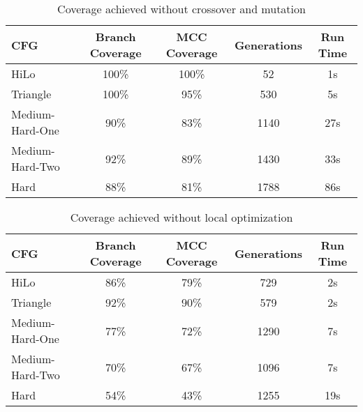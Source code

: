 \documentclass[runningheads]{llncs}
\begin{document}
\begin{table}[h!]
	\begin{center}
		\begin{tabular}{| l | c | c | c | c |}
			\hline
			CFG             & Branch Coverage & MCC Coverage & Generations & Run Time \\ \hline
			HiLo            & 100\%           & 100\%        & 52          & 1s       \\ \hline
			Triangle        & 100\%           & 95\%         & 530         & 5s       \\ \hline
			Medium-Hard-One & 90\%            & 83\%         & 1140        & 27s      \\ \hline
			Medium-Hard-Two & 92\%            & 89\%         & 1430        & 33s      \\ \hline
			Hard            & 88\%            & 81\%         & 1788        & 86s      \\ \hline
		\end{tabular}
	\end{center}
	\caption{Coverage achieved without crossover and mutation}
	\label{tab:CovNoGA}
\end{table}

\begin{table}[h!]
	\begin{center}
		\begin{tabular}{| l | c | c | c | c |}
			\hline
			CFG             & Branch Coverage & MCC Coverage & Generations & Run Time \\ \hline
			HiLo            & 86\%            & 79\%         & 729         & 2s       \\ \hline
			Triangle        & 92\%            & 90\%         & 579         & 2s       \\ \hline
			Medium-Hard-One & 77\%            & 72\%         & 1290        & 7s       \\ \hline
			Medium-Hard-Two & 70\%            & 67\%         & 1096        & 7s       \\ \hline
			Hard            & 54\%            & 43\%         & 1255        & 19s      \\ \hline
		\end{tabular}
	\end{center}
	\caption{Coverage achieved without local optimization}
	\label{tab:CovNoLO}
\end{table}
\end{document}
